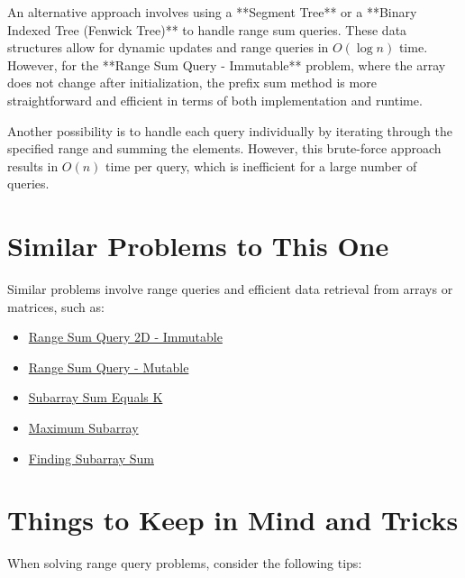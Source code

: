 An alternative approach involves using a **Segment Tree** or a **Binary Indexed Tree (Fenwick Tree)** to handle range sum queries. These data structures allow for dynamic updates and range queries in \( O(\log n) \) time. However, for the **Range Sum Query - Immutable** problem, where the array does not change after initialization, the prefix sum method is more straightforward and efficient in terms of both implementation and runtime.

Another possibility is to handle each query individually by iterating through the specified range and summing the elements. However, this brute-force approach results in \( O(n) \) time per query, which is inefficient for a large number of queries.

\section*{Similar Problems to This One}

Similar problems involve range queries and efficient data retrieval from arrays or matrices, such as:

\begin{itemize}
    \item \hyperref[problem:range_sum_query_2d_immutable]{Range Sum Query 2D - Immutable}
    \item \hyperref[problem:range_sum_query_mutable]{Range Sum Query - Mutable}
    \item \hyperref[problem:subarray_sum_equals_k]{Subarray Sum Equals K}
    \item \hyperref[problem:maximum_subarray]{Maximum Subarray}
    \item \hyperref[problem:finding_subarray_sum]{Finding Subarray Sum}
\end{itemize}

\section*{Things to Keep in Mind and Tricks}

When solving range query problems, consider the following tips:

